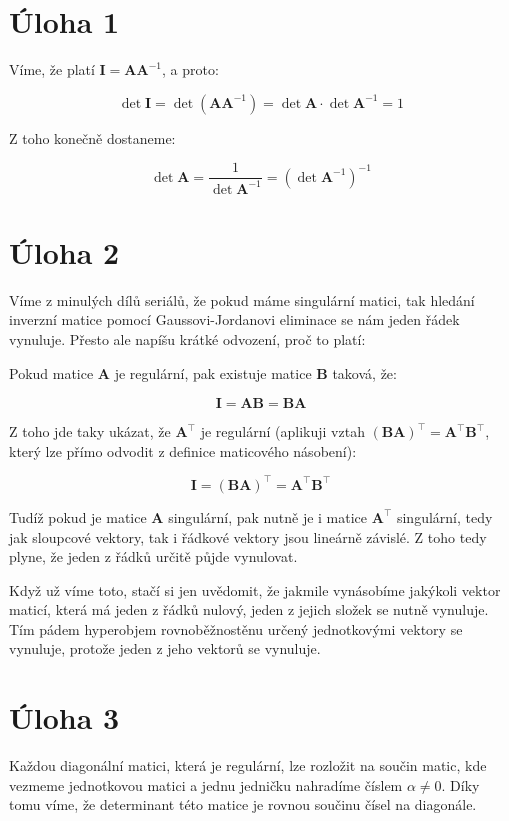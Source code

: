 \documentclass{fkssolpub}
\author{Ondřej Sedláček}
\begin{document}
\section{Úloha 1}

Víme, že platí $\mathbf{I} = \mathbf{A} \mathbf{A}^{-1}$, a proto:

\[
  \det \mathbf{I} = \det (\mathbf{A} \mathbf{A}^{-1}) = \det \mathbf{A} \cdot \det \mathbf{A}^{-1} = 1
\]

Z toho konečně dostaneme:

\[
  \det \mathbf{A} = \frac{1}{\det \mathbf{A}^{-1}} = (\det \mathbf{A}^{-1})^{-1}
\]

\section{Úloha 2}

Víme z minulých dílů seriálů, že pokud máme singulární matici, tak hledání inverzní matice pomocí Gaussovi-Jordanovi eliminace se nám jeden řádek vynuluje. Přesto ale napíšu krátké odvození, proč to platí:

Pokud matice $\mathbf{A}$ je regulární, pak existuje matice $\mathbf{B}$ taková, že: 

\[
  \mathbf{I} = \mathbf{A} \mathbf{B} = \mathbf{B} \mathbf{A}
\]

Z toho jde taky ukázat, že $\mathbf{A}^{\top}$ je regulární (aplikuji vztah $(\mathbf{B} \mathbf{A})^{\top} = \mathbf{A}^{\top} \mathbf{B}^{\top}$, který lze přímo odvodit z definice maticového násobení):

\[
  \mathbf{I} = (\mathbf{B} \mathbf{A})^{\top} = \mathbf{A}^{\top} \mathbf{B}^{\top}
\]

Tudíž pokud je matice $\mathbf{A}$ singulární, pak nutně je i matice $\mathbf{A}^{\top}$ singulární, tedy jak sloupcové vektory, tak i řádkové vektory jsou lineárně závislé. Z toho tedy plyne, že jeden z řádků určitě půjde vynulovat.

Když už víme toto, stačí si jen uvědomit, že jakmile vynásobíme jakýkoli vektor maticí, která má jeden z řádků nulový, jeden z jejich složek se nutně vynuluje. Tím pádem hyperobjem rovnoběžnostěnu určený jednotkovými vektory se vynuluje, protože jeden z jeho vektorů se vynuluje.


\section{Úloha 3}

Každou diagonální matici, která je regulární, lze rozložit na součin matic, kde vezmeme jednotkovou matici a jednu jedničku nahradíme číslem $\alpha \neq 0$. Díky tomu víme, že determinant této matice je rovnou součinu čísel na diagonále.
\end{document}
